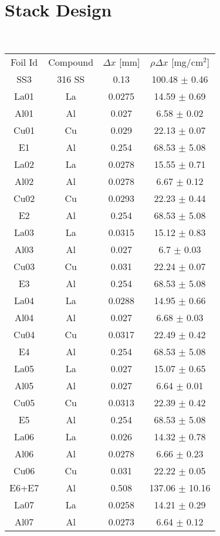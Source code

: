 \section{Stack Design}
\label{stack_appendix}
\ \ 
\begin{ruledtabular}
\begin{tabular}{cccc}
Foil Id & Compound & $\Delta x$ [mm] & $\rho \Delta x$ [mg/cm$^2$] \\
SS3 & 316 SS & 0.13 & 100.48 $\pm$ 0.46 \\
La01 & La & 0.0275 & 14.59 $\pm$ 0.69 \\
Al01 & Al & 0.027 & 6.58 $\pm$ 0.02 \\
Cu01 & Cu & 0.029 & 22.13 $\pm$ 0.07 \\
E1 & Al & 0.254 & 68.53 $\pm$ 5.08 \\
La02 & La & 0.0278 & 15.55 $\pm$ 0.71 \\
Al02 & Al & 0.0278 & 6.67 $\pm$ 0.12 \\
Cu02 & Cu & 0.0293 & 22.23 $\pm$ 0.44 \\
E2 & Al & 0.254 & 68.53 $\pm$ 5.08 \\
La03 & La & 0.0315 & 15.12 $\pm$ 0.83 \\
Al03 & Al & 0.027 & 6.7 $\pm$ 0.03 \\
Cu03 & Cu & 0.031 & 22.24 $\pm$ 0.07 \\
E3 & Al & 0.254 & 68.53 $\pm$ 5.08 \\
La04 & La & 0.0288 & 14.95 $\pm$ 0.66 \\
Al04 & Al & 0.027 & 6.68 $\pm$ 0.03 \\
Cu04 & Cu & 0.0317 & 22.49 $\pm$ 0.42 \\
E4 & Al & 0.254 & 68.53 $\pm$ 5.08 \\
La05 & La & 0.027 & 15.07 $\pm$ 0.65 \\
Al05 & Al & 0.027 & 6.64 $\pm$ 0.01 \\
Cu05 & Cu & 0.0313 & 22.39 $\pm$ 0.42 \\
E5 & Al & 0.254 & 68.53 $\pm$ 5.08 \\
La06 & La & 0.026 & 14.32 $\pm$ 0.78 \\
Al06 & Al & 0.0278 & 6.66 $\pm$ 0.23 \\
Cu06 & Cu & 0.031 & 22.22 $\pm$ 0.05 \\
E6+E7 & Al & 0.508 & 137.06 $\pm$ 10.16 \\
La07 & La & 0.0258 & 14.21 $\pm$ 0.29 \\
Al07 & Al & 0.0273 & 6.64 $\pm$ 0.12 \\

\end{tabular}
\end{ruledtabular}

